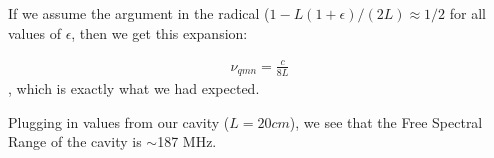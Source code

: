 
If we assume the argument in the radical ($1-L(1+\epsilon)/(2L)\approx 1/2$ for all values of $\epsilon$, then we get this expansion: 

\begin{align}
\nu_{qmn}=\frac{c}{8L}
\end{align},
which is exactly what we had expected.

Plugging in values from our cavity ($L=20 cm$), we see that the Free Spectral Range of the cavity is $\sim$187 MHz.










